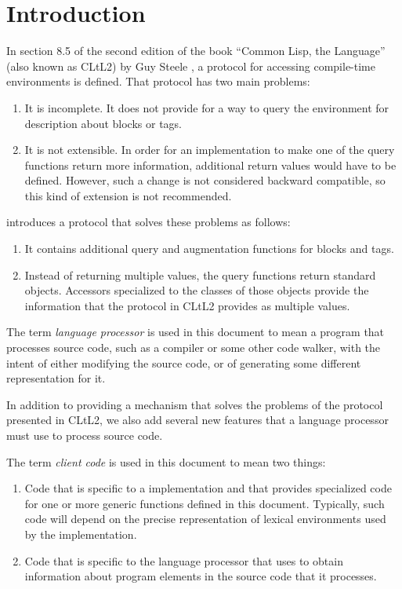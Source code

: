 \chapter{Introduction}
%

In section 8.5 of the second edition of the book ``Common Lisp, the
Language'' (also known as CLtL2) by Guy Steele
\cite{Steele:1990:CLL:95411}, a protocol for accessing compile-time
environments is defined.  That protocol has two main problems:

\begin{enumerate}
\item It is incomplete.  It does not provide for a way to query the
  environment for description about blocks or tags.
\item It is not extensible.  In order for an implementation to make
  one of the query functions return more information, additional
  return values would have to be defined.  However, such a change is
  not considered backward compatible, so this kind of extension is not
  recommended.
\end{enumerate}

\sysname{} introduces a protocol that solves these problems as
follows:

\begin{enumerate}
\item It contains additional query and augmentation functions for
  blocks and tags.
\item Instead of returning multiple values, the query functions return
  standard objects.  Accessors specialized to the classes of those
  objects provide the information that the protocol in CLtL2
  provides as multiple values.
\end{enumerate}

The term \emph{language processor} is used in this document to mean a
program that processes source code, such as a compiler or some other
code walker, with the intent of either modifying the source code, or
of generating some different representation for it.

In addition to providing a mechanism that solves the problems of the
protocol presented in CLtL2, we also add several new features that a
language processor must use to process source code.

The term \emph{client code} is used in this document to mean two
things:

\begin{enumerate}
\item Code that is specific to a \commonlisp{} implementation and that
  provides specialized code for one or more generic functions defined
  in this document.  Typically, such code will depend on the precise
  representation of lexical environments used by the implementation.
\item Code that is specific to the language processor that uses
  \sysname{} to obtain information about program elements in the
  source code that it processes.
\end{enumerate}

